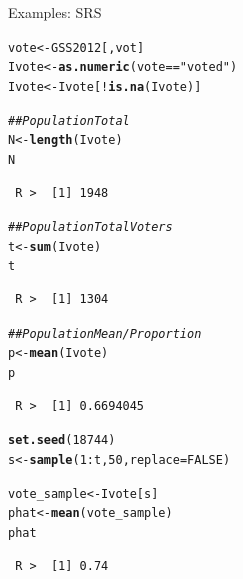 \documentclass[10pt]{beamer}\usepackage[]{graphicx}\usepackage[]{xcolor}
\makeatletter
\newcommand{\hlnum}[1]{\textcolor[rgb]{0.686,0.059,0.569}{#1}}%
\newcommand{\hlstr}[1]{\textcolor[rgb]{0.192,0.494,0.8}{#1}}%
\newcommand{\hlcom}[1]{\textcolor[rgb]{0.678,0.584,0.686}{\textit{#1}}}%
\newcommand{\hlopt}[1]{\textcolor[rgb]{0,0,0}{#1}}%
\newcommand{\hlstd}[1]{\textcolor[rgb]{0.345,0.345,0.345}{#1}}%
\newcommand{\hlkwb}[1]{\textcolor[rgb]{0.69,0.353,0.396}{#1}}%
\newcommand{\hlkwc}[1]{\textcolor[rgb]{0.333,0.667,0.333}{#1}}%
\newcommand{\hlkwd}[1]{\textcolor[rgb]{0.737,0.353,0.396}{\textbf{#1}}}%
\newenvironment{kframe}{%
 \def\at@end@of@kframe{}%
 \ifinner\ifhmode%
  \def\at@end@of@kframe{\end{minipage}}%
  \begin{minipage}{\columnwidth}%
 \fi\fi%
 \def\FrameCommand##1{\hskip\@totalleftmargin \hskip-\fboxsep
 \colorbox{shadecolor}{##1}\hskip-\fboxsep
     \hskip-\linewidth \hskip-\@totalleftmargin \hskip\columnwidth}%
 \MakeFramed {\advance\hsize-\width
   \@totalleftmargin\z@ \linewidth\hsize
   \@setminipage}}%
 {\par\unskip\endMakeFramed%
 \at@end@of@kframe}
\newenvironment{knitrout}{}{} %
\makeatother
\begin{document}
\begin{frame}[containsverbatim]{Examples: SRS}
\tiny
\begin{knitrout}
\color{fgcolor}\begin{kframe}
\begin{alltt}
\hlstd{vote} \hlkwb{<-} \hlstd{GSS2012[, vot]}
\hlstd{Ivote} \hlkwb{<-} \hlkwd{as.numeric}\hlstd{(vote} \hlopt{==} \hlstr{"voted"}\hlstd{)}
\hlstd{Ivote} \hlkwb{<-} \hlstd{Ivote[}\hlopt{!}\hlkwd{is.na}\hlstd{(Ivote)]}

\hlcom{## Population Total}
\hlstd{N} \hlkwb{<-} \hlkwd{length}\hlstd{(Ivote)}
\hlstd{N}
\end{alltt}
\begin{verbatim}
 R >  [1] 1948
\end{verbatim}
\begin{alltt}
\hlcom{## Population Total Voters}
\hlstd{t} \hlkwb{<-} \hlkwd{sum}\hlstd{(Ivote)}
\hlstd{t}
\end{alltt}
\begin{verbatim}
 R >  [1] 1304
\end{verbatim}
\begin{alltt}
\hlcom{## Population Mean/Proportion}
\hlstd{p} \hlkwb{<-} \hlkwd{mean}\hlstd{(Ivote)}
\hlstd{p}
\end{alltt}
\begin{verbatim}
 R >  [1] 0.6694045
\end{verbatim}
\begin{alltt}
\hlkwd{set.seed}\hlstd{(}\hlnum{18744}\hlstd{)}
\hlstd{s} \hlkwb{<-} \hlkwd{sample}\hlstd{(}\hlnum{1}\hlopt{:}\hlstd{t,} \hlnum{50}\hlstd{,} \hlkwc{replace} \hlstd{=} \hlnum{FALSE}\hlstd{)}

\hlstd{vote_sample} \hlkwb{<-} \hlstd{Ivote[s]}
\hlstd{phat} \hlkwb{<-} \hlkwd{mean}\hlstd{(vote_sample)}
\hlstd{phat}
\end{alltt}
\begin{verbatim}
 R >  [1] 0.74
\end{verbatim}
\end{kframe}
\end{knitrout}
\end{frame}
\end{document}

